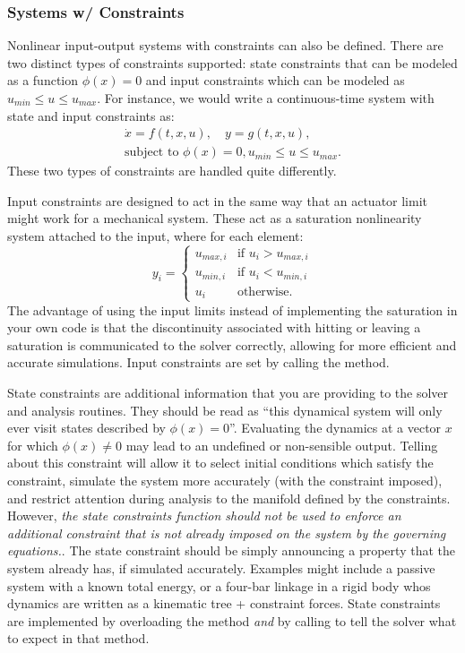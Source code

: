 \subsubsection{Systems w/ Constraints}

Nonlinear input-output systems with constraints can
also be defined.  There are two distinct types of constraints supported: state constraints that can be modeled as a function $\phi(x) = 0$ and input constraints which can be modeled as $u_{min} \le u \le u_{max}$.  For instance, we would write a continuous-time system with state and input constraints as:
\begin{gather*}
\dot{x} = f(t,x,u),\quad y = g(t,x,u), \\ \text{subject to }  \phi(x) =
0, u_{min} \le u \le u_{max}.
\end{gather*}
These two types of constraints are handled quite differently.  

Input constraints are designed to act in the same way that an actuator limit might work for a mechanical system.  These act as a saturation nonlinearity system attached to the input, where for each element: $$y_i = \begin{cases} u_{max,i} & \text{if } u_i > u_{max,i} \\ u_{min,i} & \text{if } u_i < u_{min,i} \\ u_i & \text{otherwise.}\end{cases}$$  The advantage of using the input limits instead of implementing the saturation in your own code is that the discontinuity associated with hitting or leaving a saturation is communicated to the solver correctly, allowing for more efficient and accurate simulations.  Input constraints are set by calling the  method.  

State constraints are additional information that you are providing to the solver and analysis routines.  They should be read as ``this dynamical system will only ever visit states described by $\phi(x)=0$''.  Evaluating the dynamics at a vector $x$ for which $\phi(x) \ne 0$ may lead to an undefined or non-sensible output.   Telling \robotlib about this constraint will allow it to select initial conditions which satisfy the constraint, simulate the system more accurately (with the constraint imposed), and restrict attention during analysis to the manifold defined by the constraints.  However, \emph{the state constraints function should not be used to enforce an additional constraint that is not already imposed on the system by the governing equations.}.  The state constraint should be simply announcing a property that the system already has, if simulated accurately.   Examples might include a passive system with a known total energy, or a four-bar linkage in a rigid body whos dynamics are written as a kinematic tree + constraint forces.   State constraints are implemented by overloading the  method \emph{and} by calling  to tell the solver what to expect in that method.  
 
